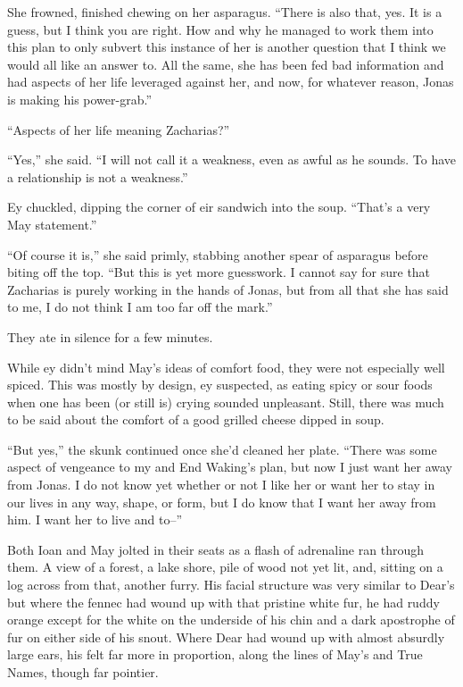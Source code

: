 She frowned, finished chewing on her asparagus. ``There is also that, yes. It is a guess, but I think you are right. How and why he managed to work them into this plan to only subvert this instance of her is another question that I think we would all like an answer to. All the same, she has been fed bad information and had aspects of her life leveraged against her, and now, for whatever reason, Jonas is making his power-grab.''

``Aspects of her life meaning Zacharias?''

``Yes,'' she said. ``I will not call it a weakness, even as awful as he sounds. To have a relationship is not a weakness.''

Ey chuckled, dipping the corner of eir sandwich into the soup. ``That's a very May statement.''

``Of course it is,'' she said primly, stabbing another spear of asparagus before biting off the top. ``But this is yet more guesswork. I cannot say for sure that Zacharias is purely working in the hands of Jonas, but from all that she has said to me, I do not think I am too far off the mark.''

They ate in silence for a few minutes.

While ey didn't mind May's ideas of comfort food, they were not especially well spiced. This was mostly by design, ey suspected, as eating spicy or sour foods when one has been (or still is) crying sounded unpleasant. Still, there was much to be said about the comfort of a good grilled cheese dipped in soup.

``But yes,'' the skunk continued once she'd cleaned her plate. ``There was some aspect of vengeance to my and End Waking's plan, but now I just want her away from Jonas. I do not know yet whether or not I like her or want her to stay in our lives in any way, shape, or form, but I do know that I want her away from him. I want her to live and to--''

Both Ioan and May jolted in their seats as a flash of adrenaline ran through them. A view of a forest, a lake shore, pile of wood not yet lit, and, sitting on a log across from that, another furry. His facial structure was very similar to Dear's but where the fennec had wound up with that pristine white fur, he had ruddy orange except for the white on the underside of his chin and a dark apostrophe of fur on either side of his snout. Where Dear had wound up with almost absurdly large ears, his felt far more in proportion, along the lines of May's and True Names, though far pointier.

